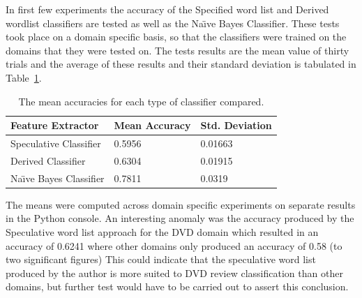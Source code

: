 \documentclass{llncs}
\begin{document}
In first few experiments the accuracy of the Specified word list and Derived wordlist classifiers are tested as well as the Na\"\i ve Bayes Classifier. These tests took place on a domain specific basis, so that the classifiers were trained on the domains that they were tested on. The tests results are the mean value of thirty trials and the average of these results and their standard deviation is tabulated in Table~\ref{tab:three_classifiers_table}.

\begin{table}
    \begin{center}
    \caption{The mean accuracies for each type of classifier compared.}
    \label{tab:three_classifiers_table}
    \begin{tabular}{| l | l | l |}
        \hline
        Feature Extractor & Mean Accuracy & Std. Deviation \\ \hline
        Speculative Classifier & 0.5956 & 0.01663 \\ \hline
        Derived Classifier & 0.6304 & 0.01915 \\ \hline
        Na\"\i ve Bayes Classifier & 0.7811 & 0.0319 \\ \hline
    \end{tabular}
    \end{center}
\end{table}


The means were computed across domain specific experiments on separate results in the Python console. An interesting anomaly was the accuracy produced by the Speculative word list approach for the DVD domain which resulted in an accuracy of 0.6241 where other domains only produced an accuracy of 0.58 (to two significant figures) This could indicate that the speculative word list produced by the author is more suited to DVD review classification than other domains, but further test would have to be carried out to assert this conclusion.
\end{document}
